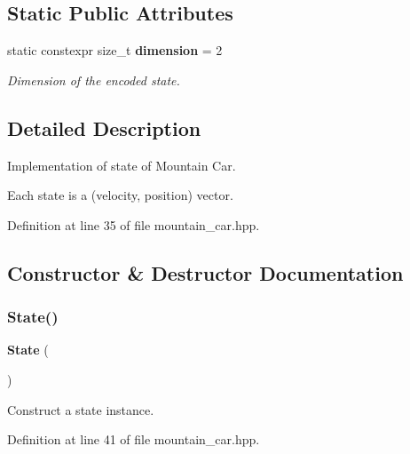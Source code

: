 \subsection*{Static Public Attributes}
\begin{DoxyCompactItemize}
\item 
static constexpr size\+\_\+t \textbf{ dimension} = 2
\begin{DoxyCompactList}\small\item\em Dimension of the encoded state. \end{DoxyCompactList}\end{DoxyCompactItemize}


\subsection{Detailed Description}
Implementation of state of Mountain Car. 

Each state is a (velocity, position) vector. 

Definition at line 35 of file mountain\+\_\+car.\+hpp.



\subsection{Constructor \& Destructor Documentation}
\mbox{\label{classmlpack_1_1rl_1_1MountainCar_1_1State_a790355057d12e9c1ce7643551c16fecd}} 
\subsubsection{State()\hspace{0.1cm}{\footnotesize\ttfamily [1/2]}}
{\footnotesize\ttfamily \textbf{ State} (\begin{DoxyParamCaption}{ }\end{DoxyParamCaption})\hspace{0.3cm}{\ttfamily [inline]}}



Construct a state instance. 



Definition at line 41 of file mountain\+\_\+car.\+hpp.

\mbox{\label{classmlpack_1_1rl_1_1MountainCar_1_1State_a8bc7967f6d91a3c94f9b3f502297a926}} 

